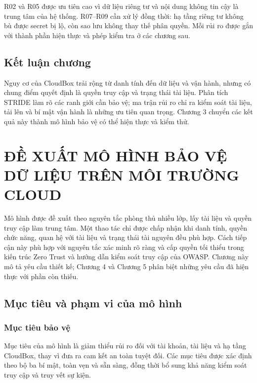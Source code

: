 R02 và R05 được ưu tiên cao vì dữ liệu riêng tư và nội dung không tin cậy là trung tâm của hệ thống. R07--R09 cần xử lý đồng thời: hạ tầng riêng tư không bù được secret bị lộ, còn sao lưu không thay thế phân quyền. Mỗi rủi ro được gắn với thành phần hiện thực và phép kiểm tra ở các chương sau.

\section{Kết luận chương}
Nguy cơ của CloudBox trải rộng từ danh tính đến dữ liệu và vận hành, nhưng có chung điểm quyết định là quyền truy cập và trạng thái tài liệu. Phân tích STRIDE làm rõ các ranh giới cần bảo vệ; ma trận rủi ro chỉ ra kiểm soát tài liệu, tải lên và bí mật vận hành là những ưu tiên quan trọng. Chương 3 chuyển các kết quả này thành mô hình bảo vệ có thể hiện thực và kiểm thử.
\chapter{ĐỀ XUẤT MÔ HÌNH BẢO VỆ DỮ LIỆU TRÊN MÔI TRƯỜNG CLOUD}
\label{chap:mohinh}
Mô hình được đề xuất theo nguyên tắc phòng thủ nhiều lớp, lấy tài liệu và quyền truy cập làm trung tâm. Một thao tác chỉ được chấp nhận khi danh tính, quyền chức năng, quan hệ với tài liệu và trạng thái tài nguyên đều phù hợp. Cách tiếp cận này phù hợp với nguyên tắc xác minh rõ ràng và cấp quyền tối thiểu trong kiến trúc Zero Trust và hướng dẫn kiểm soát truy cập của OWASP.\cite{zerotrust,authorization} Chương này mô tả yêu cầu thiết kế; Chương 4 và Chương 5 phân biệt những yêu cầu đã hiện thực với phần còn thiếu.

\section{Mục tiêu và phạm vi của mô hình}

\subsection{Mục tiêu bảo vệ}

Mục tiêu của mô hình là giảm thiểu rủi ro đối với tài khoản,
tài liệu và hạ tầng CloudBox, thay vì đưa ra cam kết an toàn
tuyệt đối. Các mục tiêu được xác định theo bộ ba bí mật,
toàn vẹn và sẵn sàng, đồng thời bổ sung khả năng kiểm soát
truy cập và truy vết sự kiện.

